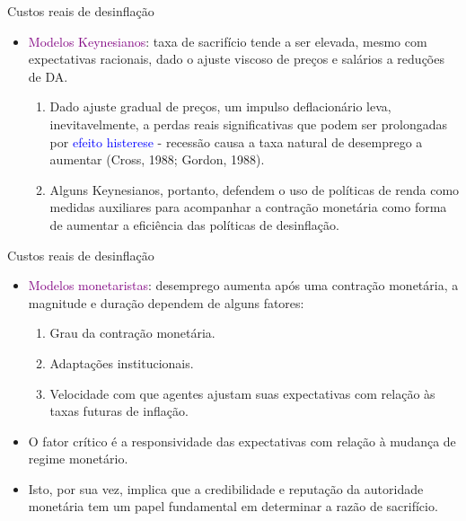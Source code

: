 \documentclass[10pt]{beamer}
\begin{document}
\begin{frame}{Custos reais de desinflação}
    \begin{itemize}
        \item \textcolor{purple}{Modelos Keynesianos}: taxa de sacrifício tende a ser elevada, mesmo com expectativas racionais, dado o ajuste viscoso de preços e salários a reduções de DA.
        \bigskip
        \begin{enumerate}
            \item Dado ajuste gradual de preços, um impulso deflacionário leva, inevitavelmente, a perdas reais significativas que podem ser prolongadas por \textcolor{blue}{efeito histerese} - recessão causa a taxa natural de desemprego a aumentar (Cross, 1988; Gordon, 1988).
            \bigskip
            \item Alguns Keynesianos, portanto, defendem o uso de políticas de renda como medidas auxiliares para acompanhar a contração monetária como forma de aumentar a eficiência das políticas de desinflação.
        \end{enumerate}
    \end{itemize}
\end{frame}

\begin{frame}{Custos reais de desinflação}
    \begin{itemize}
        \item \textcolor{purple}{Modelos monetaristas}: desemprego aumenta após uma contração monetária, a magnitude e duração dependem de alguns fatores:
        \bigskip
        \begin{enumerate}
            \item Grau da contração monetária.
            \bigskip
            \item Adaptações institucionais.
            \bigskip
            \item Velocidade com que agentes ajustam suas expectativas com relação às taxas futuras de inflação.
        \end{enumerate}
        \bigskip
        \item O fator crítico é a responsividade das expectativas com relação à mudança de regime monetário.
        \bigskip
        \item Isto, por sua vez, implica que a credibilidade e reputação da autoridade monetária tem um papel fundamental em determinar a razão de sacrifício.
    \end{itemize}
\end{frame}
\end{document}
